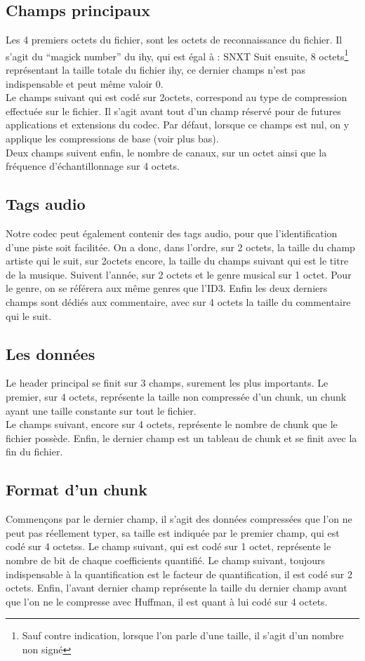 \documentclass[a4paper,12pt]{article}
\begin{document}
\subsection{Champs principaux}
Les 4 premiers octets du fichier, sont les octets de reconnaissance du fichier.
Il s'agit du ``magick number'' du ihy, qui est égal à : SNXT
Suit ensuite, 8 octets\footnote{Sauf contre indication, lorsque l'on parle d'une
taille, il s'agit d'un nombre non signé}
représentant la taille totale du fichier ihy, ce dernier
champs n'est pas indispensable et peut même valoir 0.\\
Le champs suivant qui est codé sur 2octets, correspond au type de compression
effectuée sur le fichier. Il s'agit avant tout d'un champ réservé pour de
futures applications et extensions du codec. Par défaut, lorsque ce champs est
nul, on y applique les compressions de base (voir plus bas).\\
Deux champs suivent enfin, le nombre de canaux, sur un octet ainsi que la
fréquence d'échantillonnage sur 4 octets.\\
\subsection{Tags audio}
Notre codec peut également contenir des tags audio, pour que l'identification
d'une piste soit facilitée. On a donc, dans l'ordre, sur 2 octets, la taille du
champ artiste qui le suit, sur 2octets encore, la taille du champs suivant
qui est le titre de la musique. Suivent l'année, sur 2 octets et le genre
musical sur 1
octet. Pour le genre, on se référera aux même genres que l'ID3. Enfin les deux
derniers champs sont dédiés aux commentaire, avec sur 4 octets la taille du
commentaire qui le suit.
\subsection{Les données}
Le header principal se finit sur 3 champs, surement les plus importants. Le
premier, sur 4 octets, représente la taille non compressée d'un chunk, un chunk
ayant une taille constante sur tout le fichier.\\
Le champs suivant, encore sur 4 octets, représente le nombre de chunk que le
fichier possède. Enfin, le dernier champ est un tableau de chunk et se finit
avec la fin du fichier.
\subsection{Format d'un chunk}
Commençons par le dernier champ, il s'agit des données compressées que l'on ne
peut pas réellement typer, sa taille est indiquée par le premier champ,
qui est
codé sur 4 octetss. Le champ suivant, qui est cod\'e sur 1 octet,
repr\'esente le nombre de bit de chaque coefficients quantifi\'e. Le
champ suivant, toujours indispensable \`a la quantification est le
facteur de quantification, il est cod\'e sur 2 octets. Enfin, l'avant
dernier champ repr\'esente la taille du dernier champ avant que l'on ne
le compresse avec Huffman, il est quant \`a lui cod\'e sur 4 octets.
\end{document}
